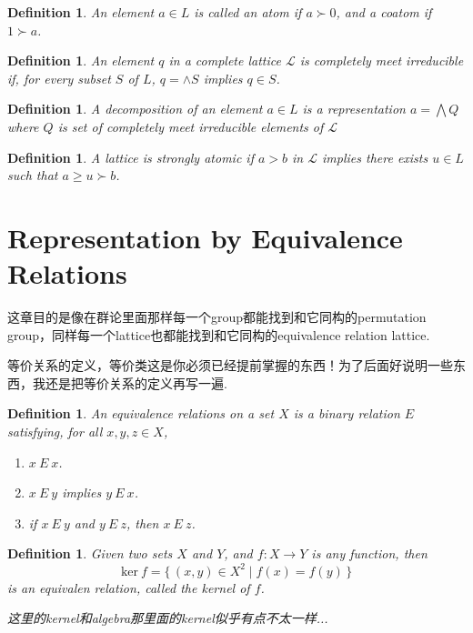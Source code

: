 \documentclass{article}
\newtheorem{definition}[theorem]{Definition}
\newcommand*{\xfunc}[4]{{#2}\colon{#3}{#1}{#4}}
\newcommand*{\func}[3]{\xfunc{\to}{#1}{#2}{#3}}
\newcommand\Set[2]{\{\,#1\mid#2\,\}} %
\newcommand\lattice{\mathcal{L}}
\begin{document}
\begin{definition}
\rm An element $a \in L$ is  called an {\color{red} atom} if $a \succ 0$, and a {\color{red} coatom} if $1 \succ a$. 
\end{definition}

\begin{definition}
\rm An element $q$ in a complete lattice $\lattice$ is {\color{red} completely meet irreducible} if, for every subset $S$ of $L$, $q  = \wedge S$ implies $q \in S$.
\end{definition}

\begin{definition}
\rm A {\color{red} decomposition} of an element $a \in L$ is a representation $a = \bigwedge Q$ where $Q$ is set of completely meet irreducible elements of $\lattice$
\end{definition}

\begin{definition}
\rm A lattice is {\color{red} strongly atomic} if $a>b$ in $\lattice$ implies there exists $u \in L$ such that $a \geq u \succ b$.
\end{definition}


\section{Representation by Equivalence Relations}

{\color{red} 这章目的是像在群论里面那样每一个group都能找到和它同构的permutation group，同样每一个lattice也都能找到和它同构的equivalence relation lattice}.

{\color{blue} 等价关系的定义，等价类这是你必须已经提前掌握的东西！为了后面好说明一些东西，我还是把等价关系的定义再写一遍}.

\begin{definition}
\rm An {\color{red} equivalence relations} on a set $X$ is a binary relation $E$ satisfying, for all $x, y, z \in X$,
\begin{enumerate}
	\item $x~E~x$.
	\item $x~E~y$ implies $y~E~x$.
	\item if $x~E~y$ and $y~E~z$, then $x~E~z$.
\end{enumerate}
\end{definition}

\begin{definition}
\rm Given two sets $X$ and $Y$, and $\func{f}{X}{Y}$ is any function, then 
$$
\text{ker}~f = \Set{(x,y) \in X^2}{f(x) = f(y)}
$$
is an equivalen relation, called the kernel of $f$. 

{\color{blue} 这里的kernel和algebra那里面的kernel似乎有点不太一样...}
\end{definition}
\end{document}
